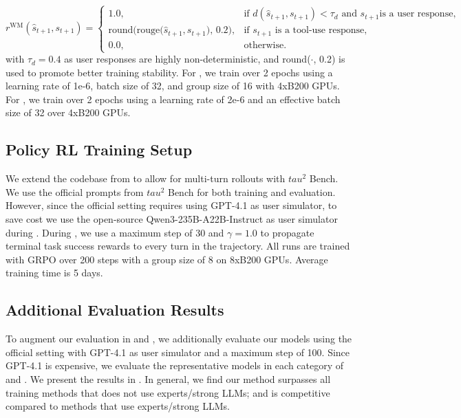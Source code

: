 \[
r^{\mathrm{WM}}(\hat{s}_{t+1}, s_{t+1}) = \begin{cases}
1.0, & \text{if } d(\hat{s}_{t+1}, s_{t+1}) < \tau_{d} \text{ and } s_{t+1} \text{is a user response}, \\
\textrm{round(rouge($\hat{s}_{t+1}, s_{t+1}$), 0.2)}, & \text{if } s_{t+1} \text{ is a tool-use response}, \\
0.0, & \text{otherwise}.
\end{cases}
\]
with $\tau_{d}=0.4$ as user responses are highly non-deterministic, and round($\cdot$, 0.2) is used to promote better training stability.
For \wmrlshort{}, we train over 2 epochs using a learning rate of 1e-6, batch size of 32, and group size of 16 with 4xB200 GPUs.
For \wmsftshort{}, we train over 2 epochs using a learning rate of 2e-6 and an effective batch size of 32 over 4xB200 GPUs.


\subsection{Policy RL Training Setup}
\label{subsec:tau2_policy_rl_setup}
We extend the codebase from  to allow for multi-turn rollouts with $tau^{2}$ Bench.
We use the official prompts from $tau^{2}$ Bench for both training and evaluation.
However, since the official setting requires using GPT-4.1 as user simulator, to save cost we use the open-source Qwen3-235B-A22B-Instruct as user simulator during \policyrl{}.
During \policyrl{}, we use a maximum step of 30 and $\gamma=1.0$ to propagate terminal task success rewards to every turn in the trajectory.
All \policyrl{} runs are trained with GRPO over 200 steps with a group size of 8 on 8xB200 GPUs. Average training time is 5 days.



\subsection{Additional Evaluation Results}
\label{subsec:tau2_additional_eval}

To augment our evaluation in  and , we additionally evaluate our models using the official setting with GPT-4.1 as user simulator and a maximum step of 100.
Since GPT-4.1 is expensive, we evaluate the representative models in each category of  and .
We present the results in .
In general, we find our method surpasses all training methods that does not use experts/strong LLMs; and is competitive compared to methods that use experts/strong LLMs.

